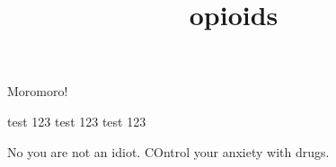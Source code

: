 \documentclass[10pt]{article}
\begin{document}
\title{opioids }
\maketitle

Moromoro!

test 123 test 123 test 123

No you are not an idiot.  
COntrol your anxiety with drugs.  
\end{document}
